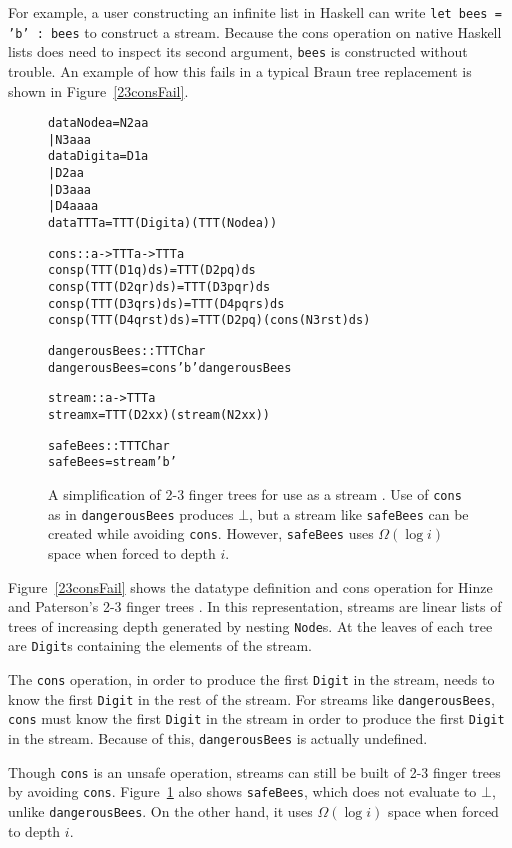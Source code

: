 \documentclass{llncs}
\begin{document}
For example, a user constructing an infinite list in Haskell can write {\tt let bees = 'b' : bees} to construct a stream.
Because the cons operation on native Haskell lists does need to inspect its second argument, {\tt bees} is constructed without trouble.
An example of how this fails in a typical Braun tree replacement is shown in Figure~\ref{23consFail}.

\begin{figure}
\begin{alltt}
data Node a = N2 a a
            | N3 a a a
data Digit a = D1 a
             | D2 a a
             | D3 a a a
             | D4 a a a a
data TTT a = TTT (Digit a) (TTT (Node a))

cons :: a -> TTT a -> TTT a
cons p (TTT (D1 q)       ds) = TTT (D2 p q) ds
cons p (TTT (D2 q r)     ds) = TTT (D3 p q r) ds
cons p (TTT (D3 q r s)   ds) = TTT (D4 p q r s) ds
cons p (TTT (D4 q r s t) ds) = TTT (D2 p q) (cons (N3 r s t) ds)

dangerousBees :: TTT Char
dangerousBees = cons 'b' dangerousBees

stream :: a -> TTT a
stream x = TTT (D2 x x) (stream (N2 x x))

safeBees :: TTT Char
safeBees = stream 'b'
\end{alltt}
\caption{
A simplification of 2-3 finger trees for use as a stream \cite{HinzePat}. 
Use of {\tt cons} as in {\tt dangerousBees} produces $\bot$, but a stream like {\tt safeBees} can be created while avoiding {\tt cons}.
However, {\tt safeBees} uses $\Omega(\log i)$ space when forced to depth $i$.
}
\label{23consFail}
\label{23stream}
\end{figure}

Figure~\ref{23consFail} shows the datatype definition and cons operation for Hinze and Paterson's 2-3 finger trees \cite{HinzePat}.
In this representation, streams are linear lists of trees of increasing depth generated by nesting {\tt Node}s.
At the leaves of each tree are {\tt Digit}s containing the elements of the stream.

The {\tt cons} operation, in order to produce the first {\tt Digit} in the stream, needs to know the first {\tt Digit} in the rest of the stream.
For streams like {\tt dangerousBees}, {\tt cons} must know the first {\tt Digit} in the stream in order to produce the first {\tt Digit} in the stream.
Because of this, {\tt dangerousBees} is actually undefined.

Though {\tt cons} is an unsafe operation, streams can still be built of 2-3 finger trees by avoiding {\tt cons}.
Figure~\ref{23stream} also shows {\tt safeBees}, which does not evaluate to $\bot$, unlike {\tt dangerousBees}.
On the other hand, it uses $\Omega(\log i)$ space when forced to depth $i$.
\end{document}
